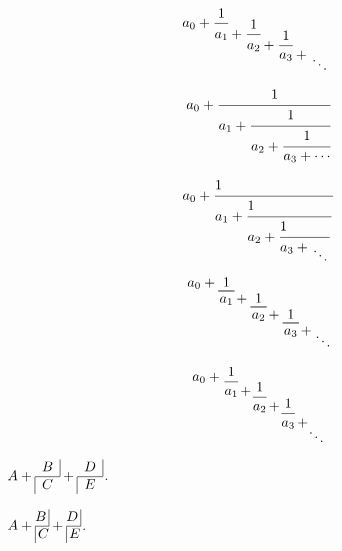 \documentclass{article}
\begin{document}
	\newcommand*{\cofrac}[2]{%
		{%
			\rlap{$\dfrac{1}{\phantom{#1}}$}%
			\genfrac{}{}{0pt}{0}{}{#1+#2}%
		}%
	}
	\[
	a_0 +
	\cofrac{a_1}{
		\cofrac{a_2}{
			\cofrac{a_3}{
				\genfrac{}{}{0pt}{0}{}{\ddots}
	}}}
	\]
	
	\begin{equation*}
		a_0+\cfrac{1}{a_1+\cfrac{1}{a_2+\cfrac{1}{a_3+\cdots}}}
	\end{equation*}

	\def\cof#1{\displaystyle{1\strut\hfill\over #1}}
	$$ a_0 + \cof{a_1 + \cof{a_2 + \cof{a_3 + {\atop\ddots}}}} $$
	
	\newcommand*{\underBracket}[2][1]{\underbracket[.6pt][0pt]{~#1\vphantom{g}~}_{\displaystyle #2\vphantom{g+1}}}
	\begin{equation}
		a_0 + \underBracket{a_1\mathrlap{{}+ \underBracket{a_2\mathrlap{{} + \underBracket{a_3\mathrlap{{}+{}\raise-2.2ex\hbox{$\smash\ddots$}}}}}}}
		\hphantom{a_1 + a_2 + a_3 + {}} %
	\end{equation}

	\[
		a_0+
		\raisebox{-.25\height}{$\dfrac{1}{a_1\mathrlap{\,+}}$}\mkern15mu
		\raisebox{-1.1\height}{$\dfrac{1}{a_2\mathrlap{\,+}}$}\mkern15mu
		\raisebox{-2.0\height}{$\dfrac{1}{a_3\mathrlap{\,+}}$}\mkern15mu
		\raisebox{-3\height}{$\ddots$}
	\]
	
	\def\cFrac#1#2{%
		\begin{array}{@{}c@{}}\multicolumn{1}{c|}{#1}\\%
			\hline\multicolumn{1}{|c}{#2}\end{array}}
	
	\def\cFracB#1#2{%
		\vcenter{\hbox{\strut$#1$\,\vrule}\hrule\hbox{\strut\vrule\,$#2$}}}
	
	$ A + \cFrac{B}{C} + \cFrac{D}{E}$.
	
	$ A + \cFracB{B}{C} + \cFracB{D}{E}$.
\end{document}
